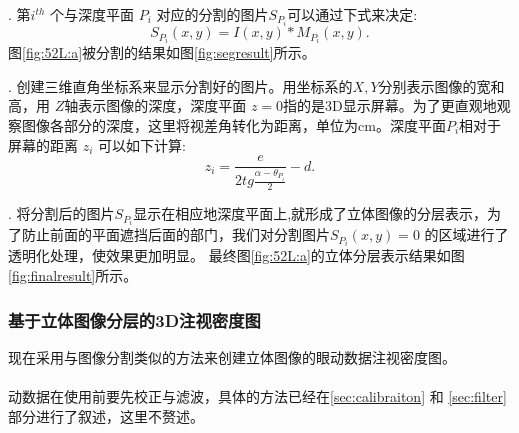 \uppercase\expandafter{}.
第$i^{th}$ 个与深度平面 ${{{P_i}}}$ 对应的分割的图片${S_{{P_i}}}$可以通过下式来决定:
\begin{equation}
{S_{{P_i}}}(x,y) = I(x,y)*{M_{{P_i}}}(x,y).
\end{equation}
图\ref{fig:52L:a}被分割的结果如图\ref{fig:segresult}所示。


\uppercase\expandafter{}.
创建三维直角坐标系来显示分割好的图片。用坐标系的$X, Y$分别表示图像的宽和高，用 $Z$轴表示图像的深度，深度平面 $z = 0$指的是3D显示屏幕。为了更直观地观察图像各部分的深度，这里将视差角转化为距离，单位为cm。深度平面${P_i}$相对于屏幕的距离 $z_i$ 可以如下计算:
\begin{equation}
{z_i} = \frac{e}{{2tg\frac{{\alpha  - {\theta_{{P_i}}}}}{2}}} - d.
\end{equation}

\uppercase\expandafter{}.
将分割后的图片${S_{{P_i}}}$显示在相应地深度平面上,就形成了立体图像的分层表示，为了防止前面的平面遮挡后面的部门，我们对分割图片${S_{{P_i}}}(x,y) = 0$ 的区域进行了透明化处理，使效果更加明显。
最终图\ref{fig:52L:a}的立体分层表示结果如图\ref{fig:finalresult}所示。
\begin{figure}[t]
  \centering
  \hspace{1in}
\end{figure}

\subsubsection{基于立体图像分层的3D注视密度图}
\label{sec:create3Dfixationdensitymap}
现在采用与图像分割类似的方法来创建立体图像的眼动数据注视密度图。
\\[0.2cm]
\\[0.2cm]
动数据在使用前要先校正与滤波，具体的方法已经在\ref{sec:calibraiton}  和 \ref{sec:filter}   部分进行了叙述，这里不赘述。

